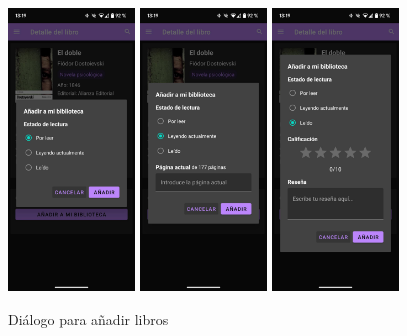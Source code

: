 \documentclass[a4paper,12pt]{report}
\begin{document}
      \begin{figure}[H]
        \centering
        \includegraphics[width=0.3\textwidth]{.img/libro-porleer.png}
        \includegraphics[width=0.3\textwidth]{.img/libro-leyendo.png}
        \includegraphics[width=0.3\textwidth]{.img/libro-leido.png}
        \caption{Diálogo para añadir libros}
        \label{fig:libro-porleer}
      \end{figure}
      
\end{document}

